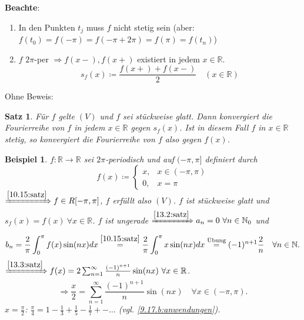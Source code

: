 \documentclass[titlepage,ngerman,a4paper,headsepline]{scrartcl}
\newcommand{\N}{\mathbb{N}}
\newcommand{\R}{\mathbb{R}}
\theoremstyle{named}
\theoremstyle{dotless}
\newtheorem{satz}[namedtheorem]{Satz}
\newtheorem{beispiel}[namedtheorem]{Beispiel}
\begin{document}
\textbf{Beachte}: ~\
\begin{enumerate}
	\item In den Punkten $t_{j}$ muss $f$ nicht stetig sein (aber: $f(t_{0}) = f(-\pi) = f(-\pi + 2\pi) = f(\pi) = f(t_{n})$)
	\item $f$ $2\pi$-per $\Rightarrow f(x-), f(x+)$ existiert in jedem $x \in \R$.
		$$ s_{f}(x) \coloneqq \frac{f(x+) + f(x-)}{2} \quad (x \in \R) $$
\end{enumerate}

Ohne Beweis:

\begin{satz} \label{13.3:satz}
	Für $f$ gelte $(V)$ und $f$ sei stückweise glatt. Dann konvergiert die Fourierreihe von $f$ in jedem $x \in \R$ gegen $s_{f}(x)$. Ist in diesem Fall $f$ in $x \in \R$ stetig, so konvergiert die Fourierreihe von $f$ also gegen $f(x)$.	
\end{satz}


\begin{beispiel} \label{13.4:bsp}
	$f \colon \R \rightarrow \R$ sei $2\pi$-periodisch und auf $(-\pi, \pi]$ definiert durch
	$$ f(x) \coloneqq \begin{cases} x, & x \in (-\pi, \pi) \\ 0, & x = \pi \end{cases} $$
	$\xRightarrow[]{\ref{10.15:satz}} f \in R[-\pi, \pi]$, $f$ erfüllt also $(V)$. $f$ ist stückweise glatt und $s_{f}(x) = f(x) ~\forall x \in \R$. $f$ ist ungerade $\xRightarrow[]{\ref{13.2:satz}} a_{n} = 0 ~\forall n \in \N_{0}$ und
	$$ b_{n} = \frac{2}{\pi} \int_{0}^{\pi} f(x) \sin(nx) dx \overset{\ref{10.15:satz}}{=} \frac{2}{\pi} \int_{0}^{\pi} x \sin(nx) dx \overset{\text{Übung}}{=} (-1)^{n+1} \frac{2}{n} \quad \forall n \in \N. $$
	$\xRightarrow[]{\ref{13.3:satz}} f(x) = 2 \sum_{n=1}^{\infty} \frac{(-1)^{n+1}}{n} \sin(nx) ~\forall x \in \R$.
	$$ \Rightarrow \frac{x}{2} = \sum_{n=1}^{\infty} \frac{(-1)^{n+1}}{n} \sin(nx) \quad \forall x \in (-\pi, \pi). $$
	$x = \frac{\pi}{2}$: $\frac{\pi}{4} = 1 - \frac{1}{3} + \frac{1}{5} - \frac{1}{7} +- \dotsc$ (vgl. \ref{9.17.b:anwendungen}).
\end{beispiel}
\end{document}
